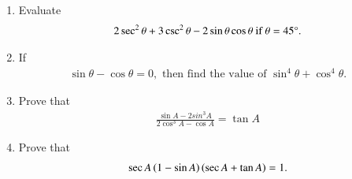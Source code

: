 \begin{enumerate}[label=\thesubsection.\arabic*.,ref=\thesubsection.\theenumi]
\hfill{}\item
Evaluate \begin{align}
2\sec^2\theta + 3\csc^2\theta - 2\sin\theta\cos\theta  \ \text{if} \ \theta = 45\degree.
\end{align}
\hfill{}\item 
If \begin{align} 
\sin\theta - \cos\theta = 0, \text{ then find the value of }\sin^4\theta + \cos^4\theta.
\end{align}
\hfill{}\item
Prove that \begin{align} \frac{\sin{A}-2sin^3{A}}{2\cos^3{A}-\cos{A}}=\tan{A} \end{align}
\hfill{}\item
Prove that \begin{align} \sec{A\ensuremath{\left(1-\sin{A}\right)}\ensuremath{\left(\sec{A}+\tan{A}\right)}}=1. \end{align}
\hfill{}
\end{enumerate}
